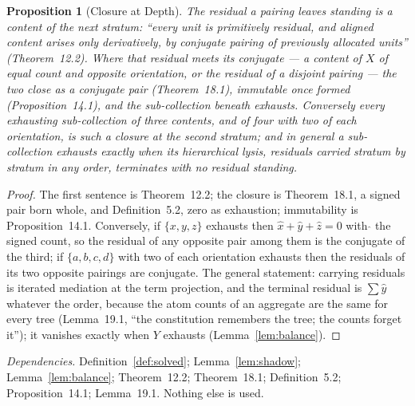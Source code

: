 \documentclass[pdflatex,sn-mathphys-num]{sn-jnl}
\theoremstyle{thmstyleone}%
\newtheorem{proposition}[theorem]{Proposition}
\theoremstyle{thmstyletwo}%
\theoremstyle{thmstylethree}%
\newtheorem{proposition}[theorem]{Proposition}
\newcommand{\q}[1]{``#1''}        %
\newcommand{\deps}[1]{\par\begin{sloppypar}\noindent\emph{Dependencies.} #1 Nothing else is used.\end{sloppypar}}
\begin{document}
\begin{proposition}[Closure at Depth]\label{prop:closure}
The residual a pairing leaves standing is a content of the next stratum: \q{every unit is primitively residual, and aligned content arises only derivatively, by conjugate pairing of previously allocated units} (Theorem~12.2). Where that residual meets its conjugate --- a content of $X$ of equal count and opposite orientation, or the residual of a disjoint pairing --- the two close as a conjugate pair (Theorem~18.1), immutable once formed (Proposition~14.1), and the sub-collection beneath exhausts. Conversely every exhausting sub-collection of three contents, and of four with two of each orientation, is such a closure at the second stratum; and in general a sub-collection exhausts exactly when its hierarchical lysis, residuals carried stratum by stratum in any order, terminates with no residual standing.
\end{proposition}
\begin{proof}
The first sentence is Theorem~12.2; the closure is Theorem~18.1, a signed pair born whole, and Definition~5.2, zero as exhaustion; immutability is Proposition~14.1. Conversely, if $\{x,y,z\}$ exhausts then $\hat x+\hat y+\hat z=0$ with $\hat{}$ the signed count, so the residual of any opposite pair among them is the conjugate of the third; if $\{a,b,c,d\}$ with two of each orientation exhausts then the residuals of its two opposite pairings are conjugate. The general statement: carrying residuals is iterated mediation at the term projection, and the terminal residual is $\sum\hat y$ whatever the order, because the atom counts of an aggregate are the same for every tree (Lemma~19.1, \q{the constitution remembers the tree; the counts forget it}); it vanishes exactly when $Y$ exhausts (Lemma~\ref{lem:balance}).
\end{proof}
\deps{Definition~\ref{def:solved}; Lemma~\ref{lem:shadow}; Lemma~\ref{lem:balance}; Theorem~12.2; Theorem~18.1; Definition~5.2; Proposition~14.1; Lemma~19.1.}
\end{document}

